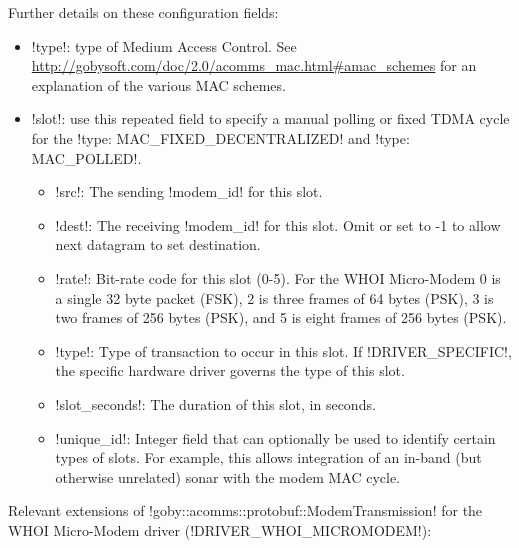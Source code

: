 Further details on these configuration fields: 
\begin{itemize}
\item !type!: type of Medium Access Control. See \url{http://gobysoft.com/doc/2.0/acomms_mac.html#amac_schemes} for an explanation of the various MAC schemes.
\item !slot!: use this repeated field to specify a manual polling or fixed TDMA cycle for the  !type: MAC_FIXED_DECENTRALIZED! and  !type: MAC_POLLED!. 
\begin{itemize}
\item !src!: The sending !modem_id! for this slot.
\item !dest!: The receiving !modem_id! for this slot. Omit or set to -1 to allow next datagram to set destination.
\item !rate!: Bit-rate code for this slot (0-5). For the WHOI Micro-Modem 0 is a single 32 byte packet (FSK), 2 is three frames of 64 bytes (PSK), 3 is two frames of 256 bytes (PSK), and 5 is eight frames of 256 bytes (PSK).
\item !type!: Type of transaction to occur in this slot. If !DRIVER_SPECIFIC!, the specific hardware driver governs the type of this slot.
\item !slot_seconds!: The duration of this slot, in seconds.
\item !unique_id!: Integer field that can optionally be used to identify certain types of slots. For example, this allows integration of an in-band (but otherwise unrelated) sonar with the modem MAC cycle.
\end{itemize} 
\end{itemize} 


Relevant extensions of !goby::acomms::protobuf::ModemTransmission! for the WHOI Micro-Modem driver (!DRIVER_WHOI_MICROMODEM!):

\resetbvlinenumber

